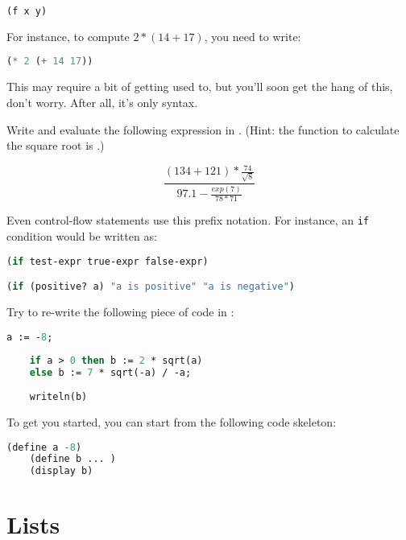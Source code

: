 \documentclass{../../../tp}
\begin{document}
\begin{lstlisting}[language=lisp]
	(f x y)
\end{lstlisting}

For instance, to compute $2 * (14 + 17)$, you need to write:

\begin{lstlisting}[language=lisp]
	(* 2 (+ 14 17))
\end{lstlisting}

This may require a bit of getting used to, but you'll soon get the hang of this, don't worry. After all, it's only syntax.

\begin{instruction}

Write and evaluate the following expression in \scheme. (Hint: the \scheme function to calculate the square root is .)

$$\frac{(134 + 121) * \frac{74}{\sqrt{8}}}{ 97.1 - \frac{exp(7)}{78 * 71} } $$
\end{instruction}

Even control-flow statements use this prefix notation. For instance, an \verb|if| condition would be written as:

\begin{lstlisting}[language=lisp]
(if test-expr true-expr false-expr)

(if (positive? a) "a is positive" "a is negative")
\end{lstlisting}


\begin{instruction}
	
	Try to re-write the following \pascal piece of code in \scheme :
	
	\begin{lstlisting}[language=Pascal]
	a := -8;
	
	if a > 0 then b := 2 * sqrt(a)
	else b := 7 * sqrt(-a) / -a;
	
	writeln(b)
	\end{lstlisting}
	
	To get you started, you can start from the following code skeleton:
	
	\begin{lstlisting}[language=lisp]
	(define a -8)
	(define b ... )
	(display b)     
	\end{lstlisting}
	
\end{instruction}




\section{Lists}
\end{document}
